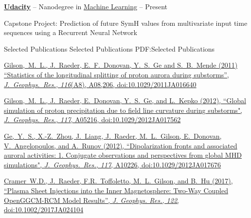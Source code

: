 \documentclass[letterpaper,MMMyyyy,nonstopmode]{simpleresumecv}
\begin{document}
\begin{Body}
\BigGap
\Entry
\href{https://www.udacity.com}
{\textbf{Udacity}}
--
Nanodegree in
\href{https://www.udacity.com/course/machine-learning-engineer-nanodegree--nd009}
{Machine Learning}
\hfill
{} -- Present

\Gap
\begin{Detail}
\BulletItem
Capstone Project: Prediction of future SymH values from multivariate input time sequences using a Recurrent Neural Network
\end{Detail}





\Section
{Selected Publications}
{Selected Publications}
{PDF:Selected Publications}
\begin{Detail}
\BigGap
\href{http://onlinelibrary.wiley.com/doi/10.1029/2011JA016640/abstract}
{\underline{Gilson,~M.~L.}, J.~Raeder, E.~F.~Donovan, Y.~S.~Ge and S.~B.~Mende (2011)
``Statistics of the longitudinal splitting of proton aurora during substorms'',
\textit{J.~Geophys.~Res., 116}(A8), A08,206, doi:10.1029/2011JA016640}

\BigGap
\href{http://onlinelibrary.wiley.com/doi/10.1029/2012JA017562/full}
{\underline{Gilson,~M.~L.}, J.~Raeder, E.~Donovan, Y.~S.~Ge, and L.~Kepko (2012), ``Global simulation of proton precipitation due to field line curvature during substorms",
\textit{J.~Geophys.~Res., 117}, A05216, doi:10.1029/2012JA017562}

\BigGap
\href{http://onlinelibrary.wiley.com/doi/10.1029/2012JA017676/abstract}{Ge,~Y.~S., X.-Z.~Zhou, J.~Liang, J.~Raeder, \underline{M.~L.~Gilson}, E.~Donovan, V.~Angelopoulos, and A.~Runov (2012), ``Dipolarization fronts and associated auroral activities: 1. Conjugate observations and perspectives from global MHD simulations", \textit{J.~Geophys.~Res., 117}, A10226, doi:10.1029/2012JA017676}

\BigGap
\href{http://onlinelibrary.wiley.com/doi/10.1002/2017JA024104/full}
{Cramer~W.D., J.~Raeder, F.R.~Toffoletto, \underline{M.~L.~Gilson}, and B.~Hu (2017), ``Plasma Sheet Injections into the Inner Magnetosphere: Two-Way Coupled OpenGGCM-RCM Model Results'',
\textit{J. Geophys. Res., 122}, doi:10.1002/2017JA024104}
\end{Detail}



\end{Body}
\end{document}
